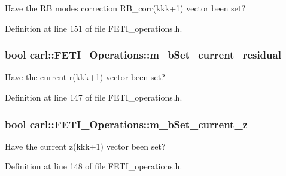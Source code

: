 Have the R\+B modes correction {\ttfamily R\+B\+\_\+corr(kkk+1)} vector been set? 



Definition at line 151 of file F\+E\+T\+I\+\_\+operations.\+h.

\hypertarget{classcarl_1_1_f_e_t_i___operations_a1f1f890054d63bdf25937e6bf66fa5ce}{}
\subsubsection[{m\+\_\+b\+Set\+\_\+current\+\_\+residual}]{\setlength{\rightskip}{0pt plus 5cm}bool carl\+::\+F\+E\+T\+I\+\_\+\+Operations\+::m\+\_\+b\+Set\+\_\+current\+\_\+residual\hspace{0.3cm}{\ttfamily [protected]}}\label{classcarl_1_1_f_e_t_i___operations_a1f1f890054d63bdf25937e6bf66fa5ce}


Have the current {\ttfamily r(kkk+1)} vector been set? 



Definition at line 147 of file F\+E\+T\+I\+\_\+operations.\+h.

\hypertarget{classcarl_1_1_f_e_t_i___operations_a979d0cf4b56999fcd126825b60ec192f}{}
\subsubsection[{m\+\_\+b\+Set\+\_\+current\+\_\+z}]{\setlength{\rightskip}{0pt plus 5cm}bool carl\+::\+F\+E\+T\+I\+\_\+\+Operations\+::m\+\_\+b\+Set\+\_\+current\+\_\+z\hspace{0.3cm}{\ttfamily [protected]}}\label{classcarl_1_1_f_e_t_i___operations_a979d0cf4b56999fcd126825b60ec192f}


Have the current {\ttfamily z(kkk+1)} vector been set? 



Definition at line 148 of file F\+E\+T\+I\+\_\+operations.\+h.

